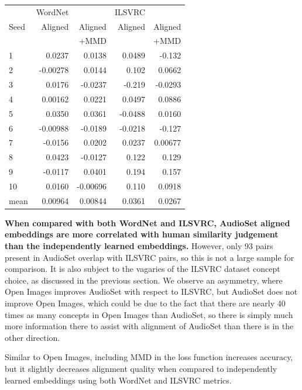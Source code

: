 \begin{table}[H]
\centering
\begin{tabular}{lrrrr}
  \toprule
       &     WordNet  &           &  ILSVRC  &            \\
{Seed} &      Aligned &  Aligned  &  Aligned &  Aligned   \\
{}     &               & +MMD     &          &   +MMD     \\
\midrule
1    &    0.0237 &     0.0138  &   0.0489 &    -0.132    \\
2    &   -0.00278 &     0.0144 &   0.102  &     0.0662   \\
3    &    0.0176 &    -0.0237  &  -0.219  &    -0.0293   \\
4    &    0.00162 &     0.0221 &   0.0497 &     0.0886   \\
5    &    0.0350 &     0.0361  &  -0.0488 &     0.0160   \\
6    &   -0.00988 &    -0.0189 &  -0.0218 &    -0.127    \\
7    &   -0.0156 &     0.0202  &   0.0237 &     0.00677  \\
8    &    0.0423 &    -0.0127  &   0.122  &     0.129    \\
9    &   -0.0117 &     0.0401  &   0.194  &     0.157    \\
10   &    0.0160 &    -0.00696 &   0.110  &     0.0918   \\
\midrule                                                                    
mean &    0.00964 &     0.00844 &   0.0361 &     0.0267  \\
\bottomrule
\end{tabular}
\end{table}

\textbf{When compared with both WordNet and ILSVRC, AudioSet aligned embeddings are more correlated with human similarity judgement than the independently learned embeddings.}  However, only 93 pairs present in AudioSet overlap with ILSVRC pairs, so this is not a large sample for comparison. It is also subject to the vagaries of the ILSVRC dataset concept choice, as discussed in the previous section. We observe an asymmetry, where Open Images improves AudioSet with respect to ILSVRC, but AudioSet does not improve Open Images, which could be due to the fact that there are nearly 40 times as many concepts in Open Images than AudioSet, so there is simply much more information there to assist with alignment of AudioSet than there is in the other direction. 

Similar to Open Images, including MMD in the loss function increases accuracy, but it slightly decreases alignment quality when compared to independently learned embeddings using both WordNet and ILSVRC metrics.


